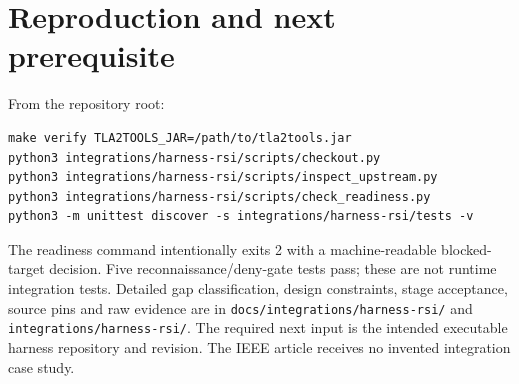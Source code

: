 \documentclass[11pt]{article}
\begin{document}
\section{Reproduction and next prerequisite}
From the repository root:
\begin{verbatim}
make verify TLA2TOOLS_JAR=/path/to/tla2tools.jar
python3 integrations/harness-rsi/scripts/checkout.py
python3 integrations/harness-rsi/scripts/inspect_upstream.py
python3 integrations/harness-rsi/scripts/check_readiness.py
python3 -m unittest discover -s integrations/harness-rsi/tests -v
\end{verbatim}
The readiness command intentionally exits 2 with a machine-readable blocked-target decision. Five reconnaissance/deny-gate tests pass; these are not runtime integration tests. Detailed gap classification, design constraints, stage acceptance, source pins and raw evidence are in \texttt{docs/integrations/harness-rsi/} and \texttt{integrations/harness-rsi/}. The required next input is the intended executable harness repository and revision. The IEEE article receives no invented integration case study.
\end{document}
